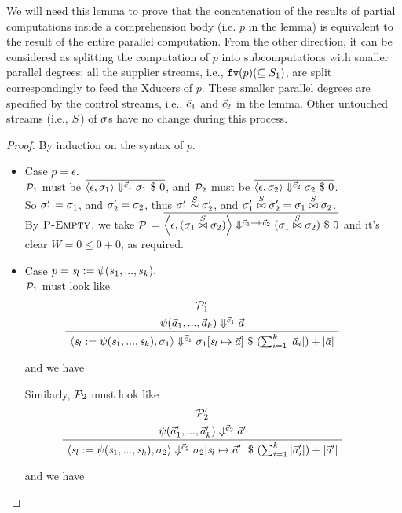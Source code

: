 We will need this lemma to prove that the concatenation of the results of partial computations inside a comprehension body (i.e. $p$ in the lemma) is equivalent to the result of the entire parallel computation. 
From the other direction, it can be considered as splitting the computation of $p$ into subcomputations with smaller parallel degrees; all the supplier streams, i.e., $\FV{p} (\subseteq \S_1)$, are split correspondingly to
feed the Xducers of $p$. 
These smaller parallel degrees are specified by the control streams, i.e., $\c_1$ and $\c_2$ in the lemma. 
Other untouched streams (i.e., $\S$) of $\sgm$s  have no change during this process.\\

\begin{proof}
	By induction on the syntax of $p$.
\def\sgmx{(\sgm_1 \x{\S} \sgm_2)}
\def\sgmpx{(\sgm_1' \x{\S} \sgm_2')}
\def\cc{\c_1 {\++} \c_2}

 
	\begin{itemize}
	\item Case $p = \epsilon$. \\
	$\MP_1$ must be $\overline{\seval{\epsilon}{\sgm_1}{\c_1}{\sgm_1}{0}}$, and
	$\MP_2$ must be $\overline{\seval{\epsilon}{\sgm_2}{\c_2}{\sgm_2}{0}}$. \\
	So $\sgm_1' = \sgm_1$, and $\sgm_2' = \sgm_2$, thus $\sgm_1' \~{\S} \sgm'_2$, and $\sgm_1' \x{\S} \sgm_2' = \sgm_1 \x{\S} \sgm_2$. \\
	
	By $\PName{Empty}$, we take $\MP$ = $\overline{\seval{\epsilon}{\sgmx}{\c_1 {\++} \c_2}{\sgmx}{0}}$ and it's clear $W= 0 \le 0+0$, as required. 
	
\item Case $p = \sdef{\s_l}{\lcall(s_1,...,s_k)}.$ \\
\def\casetwo{\sdef{\s_l}{\lcall\Tupk\s}}	
\def\eqnumtwo#1{eq-lem24-c2-{#1}}
	$\MP_1$ must look like 
	$$\PT{\UCN{\MP'_{1}}{\sevalf{\a_1}{\a_k}{\c_1}{\a}}
			\UC{\seval{\sdef{\s_l}{\lcall\Tupk\s}}{\sgm_1}{\c_1}{\sgm_1[\s_l \|-> \a]}{(\sum_{i=1}^{k}|\a_i|) + |\a|}}
	} $$

	and we have 
	
	
    Similarly, $\MP_2$ must look like 
	$$\PT{\UCN{\MP'_{2}}{\sevalf{\a_1'}{\a_k'}{\c_2}{\a'}}
		\UC{\seval{\sdef{\s_l}{\lcall\Tupk\s}}{\sgm_2}{\c_2}{\sgm_2[\s_l \|-> \a']}{(\sum_{i=1}^{k}|\a'_i|) + |\a'|}}
	} $$
	
	and we have
	

\end{itemize}
\end{proof}
